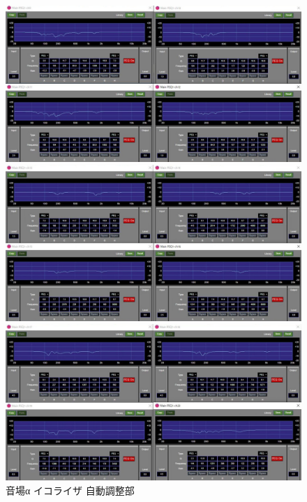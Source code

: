 \documentclass[11pt,a4j]{jreport}
\begin{document}
\begin{figure}[H]
  \begin{minipage}[b]{.5\linewidth}
    \centering
    \includegraphics[width=.9\linewidth]{images/experimentField/afcParameters/01alpha/03autoEQ3.jpg}
  \end{minipage}%
  \begin{minipage}[b]{.5\linewidth}
    \centering
    \includegraphics[width=.9\linewidth]{images/experimentField/afcParameters/01alpha/03autoEQ4.jpg}
  \end{minipage}

  \begin{minipage}[b]{1\linewidth}
    \centering
    \includegraphics[width=.45\linewidth]{images/experimentField/afcParameters/01alpha/03autoEQ5.jpg}
  \end{minipage}

  \centering
  \caption{音場α イコライザ 自動調整部}
  \label{fig:alphaイコライザ自動調整部}
\end{figure}
\newpage
\end{document}
